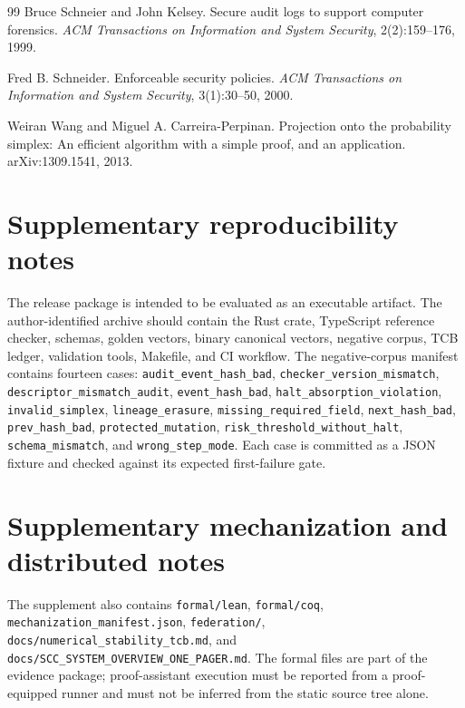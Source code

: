 \documentclass{article}
\newcommand{\gate}[1]{\texttt{\nolinkurl{#1}}}
\begin{document}
\begin{thebibliography}{99}
Bruce Schneier and John Kelsey. Secure audit logs to support computer forensics. \emph{ACM Transactions on Information and System Security}, 2(2):159--176, 1999.

Fred B. Schneider. Enforceable security policies. \emph{ACM Transactions on Information and System Security}, 3(1):30--50, 2000.

Weiran Wang and Miguel A. Carreira-Perpinan. Projection onto the probability simplex: An efficient algorithm with a simple proof, and an application. arXiv:1309.1541, 2013.
\end{thebibliography}

\clearpage
\appendix
\section{Supplementary reproducibility notes}
The release package is intended to be evaluated as an executable artifact. The author-identified archive should contain the Rust crate, TypeScript reference checker, schemas, golden vectors, binary canonical vectors, negative corpus, TCB ledger, validation tools, Makefile, and CI workflow. The negative-corpus manifest contains fourteen cases: \gate{audit_event_hash_bad}, \gate{checker_version_mismatch}, \gate{descriptor_mismatch_audit}, \gate{event_hash_bad}, \gate{halt_absorption_violation}, \gate{invalid_simplex}, \gate{lineage_erasure}, \gate{missing_required_field}, \gate{next_hash_bad}, \gate{prev_hash_bad}, \gate{protected_mutation}, \gate{risk_threshold_without_halt}, \gate{schema_mismatch}, and \gate{wrong_step_mode}. Each case is committed as a JSON fixture and checked against its expected first-failure gate.

\section{Supplementary mechanization and distributed notes}
The supplement also contains \gate{formal/lean}, \gate{formal/coq}, \gate{mechanization\_manifest.json}, \gate{federation/}, \gate{docs/numerical\_stability\_tcb.md}, and \gate{docs/SCC\_SYSTEM\_OVERVIEW\_ONE\_PAGER.md}. The formal files are part of the evidence package; proof-assistant execution must be reported from a proof-equipped runner and must not be inferred from the static source tree alone.
\end{document}
